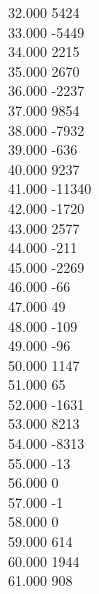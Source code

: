 { 32.000	5424 \\
 33.000	-5449 \\
 34.000	2215 \\
 35.000	2670 \\
 36.000	-2237 \\
 37.000	9854 \\
 38.000	-7932 \\
 39.000	-636 \\
 40.000	9237 \\
 41.000	-11340 \\
 42.000	-1720 \\
 43.000	2577 \\
 44.000	-211 \\
 45.000	-2269 \\
 46.000	-66 \\
 47.000	49 \\
 48.000	-109 \\
 49.000	-96 \\
 50.000	1147 \\
 51.000	65 \\
 52.000	-1631 \\
 53.000	8213 \\
 54.000	-8313 \\
 55.000	-13 \\
 56.000	0 \\
 57.000	-1 \\
 58.000	0 \\
 59.000	614 \\
 60.000	1944 \\
 61.000	908 \\
}
